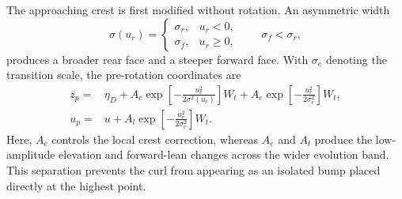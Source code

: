 The approaching crest is first modified without rotation. An asymmetric width
\begin{equation}
\sigma(u_r)=
\begin{cases}
\sigma_r,&u_r<0,\\
\sigma_f,&u_r\geq0,
\end{cases}
\qquad \sigma_f<\sigma_r,
\label{eq:asymmetric_crest_width}
\end{equation}
produces a broader rear face and a steeper forward face. With $\sigma_e$ denoting the transition scale, the pre-rotation coordinates are
\begin{align}
z_p={}&\eta_D
+A_c\exp\!\left[-\frac{u_r^2}{2\sigma^2(u_r)}\right]W_t
+A_e\exp\!\left[-\frac{u_r^2}{2\sigma_e^2}\right]W_t,
\nonumber\\
u_p={}&u
+A_l\exp\!\left[-\frac{u_r^2}{2\sigma_e^2}\right]W_t.
\label{eq:pre_rotation_evolution}
\end{align}
Here, $A_c$ controls the local crest correction, whereas $A_e$ and $A_l$ produce the low-amplitude elevation and forward-lean changes across the wider evolution band. This separation prevents the curl from appearing as an isolated bump placed directly at the highest point.

